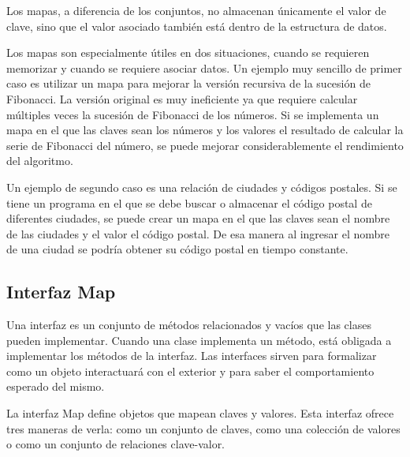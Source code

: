 \documentclass[11pt]{article}
\begin{document}
\par

Los mapas, a diferencia de los conjuntos, no almacenan únicamente el 
valor de clave, sino que el valor asociado también está dentro de la 
estructura de datos.

\par

Los mapas son especialmente útiles en dos situaciones, cuando se 
requieren memorizar y cuando se requiere asociar datos. Un ejemplo 
muy sencillo de primer caso es utilizar un mapa para mejorar la 
versión recursiva de la sucesión de Fibonacci. La versión original es 
muy ineficiente ya que requiere calcular múltiples veces la sucesión 
de Fibonacci de los números. Si se implementa un mapa en el que las 
claves sean los números y los valores el resultado de calcular la 
serie de Fibonacci del número, se puede mejorar considerablemente el 
rendimiento del algoritmo.

\par

Un ejemplo de segundo caso es una relación de ciudades y códigos 
postales. Si se tiene un programa en el que se debe buscar o 
almacenar el código postal de diferentes ciudades, se puede crear un 
mapa en el que las claves sean el nombre de las ciudades y el valor 
el código postal. De esa manera al ingresar el nombre de una ciudad 
se podría obtener su código postal en tiempo constante.

\subsection{Interfaz Map}

\par

Una interfaz es un conjunto de métodos relacionados y vacíos que las 
clases pueden implementar. Cuando una clase implementa un método, 
está obligada a implementar los métodos de la interfaz. Las 
interfaces sirven para formalizar como un objeto interactuará con el 
exterior y para saber el comportamiento esperado del mismo.

\par

La interfaz Map define objetos que mapean claves y valores. Esta 
interfaz ofrece tres maneras de verla: como un conjunto de claves, 
como una colección de valores o como un conjunto de relaciones clave-valor.

\par
\end{document}
